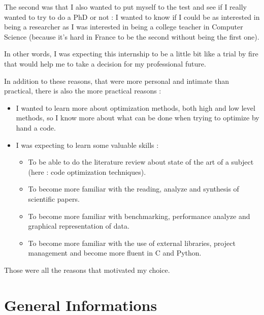 \documentclass[paper=a4, fontsize=11pt]{scrartcl}
\numberwithin{equation}{section}        %
\numberwithin{figure}{section}          %
\numberwithin{table}{section}               %
\begin{document}
The second was that I also wanted to put myself to the test and see if I really 
wanted to try to do a PhD or not : I wanted to know if I could be as interested in being
a researcher as I was interested in being a college teacher in Computer Science
(because it's hard in France to be the second without being the first one).

In other words,
I was expecting this internship to be a little bit like a trial by fire that would help me
to take a decision for my professional future.

\bigskip

In addition to these reasons, that were more personal and intimate than practical, there is
also the more practical reasons :
\begin{itemize}
    \item[] I wanted to learn more about optimization methods, both high and low level methods,
        so I know more about what can be done when trying to optimize by hand a code.
    \item[] I was expecting to learn some valuable skills :
        \begin{itemize}
            \item To be able to do the literature review about state of the art of
                a subject (here : code optimization techniques).
            \item To become more familiar with the reading, analyze and synthesis of
                scientific papers.
            \item To become more familiar with benchmarking, performance analyze and
                graphical representation of data.
            \item To become more familiar with the use of external libraries, project
                management and become more fluent in C and Python.
        \end{itemize}
\end{itemize}

\bigskip

Those were all the reasons that motivated my choice.


\section{General Informations}
\end{document}
